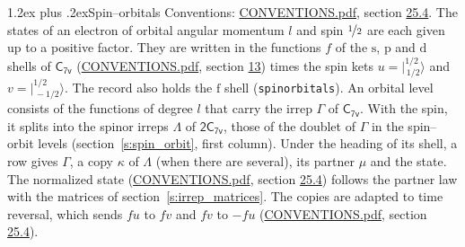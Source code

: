 \documentclass[10pt,a4paper]{article}
\makeatletter
\renewcommand\section{\@startsection{section}{1}{\z@}{-3ex plus -1ex minus -.2ex}%
  {1.2ex plus .2ex}{\normalfont\large\sffamily\bfseries\color{parttitle}}}
\numberwithin{equation}{section}
\newcommand{\grp}[1]{\mathsf{#1}}
\newcommand{\orbital}[1]{\mathrm{#1}}
\newcommand{\mult}{\kappa}
\newcommand{\intx}{\mu}
\newcommand{\jm}[2]{\bigl\lvert{}^{#1}_{\,#2}\bigr\rangle}
\makeatother
\begin{document}
\section{Spin--orbitals}\label{s:spin_orbitals}
Conventions: \href{../../CONVENTIONS.pdf}{CONVENTIONS.pdf}, section \href{../../CONVENTIONS.pdf\#conv.25.4}{25.4}.
\leavevmode\label{n:index.orbital.l}The states of an electron of orbital angular momentum $l$ and spin $\nicefrac{1}{2}$ are each given up to a positive factor. \label{n:local.spinor.uv}\label{n:local.function.f}They are written in the functions $f$ of the $\orbital{s}$, $\orbital{p}$ and $\orbital{d}$ shells of \href{../../../rotation/data/pdf/C7v.pdf}{$\grp{C_{7v}}$} (\href{../../CONVENTIONS.pdf}{CONVENTIONS.pdf}, section \href{../../../rotation/CONVENTIONS.pdf\#conv.13}{13}) times the spin kets $u = \jm{1/2}{1/2}$ and $v = \jm{1/2}{-1/2}$. The record also holds the $\orbital{f}$ shell (\texttt{spinorbitals}). An orbital level consists of the functions of degree $l$ that carry the irrep $\Gamma$ of \href{../../../rotation/data/pdf/C7v.pdf}{$\grp{C_{7v}}$}. With the spin, it splits into the spinor irreps $\Lambda$ of $\grp{2C_{7v}}$, those of the doublet of $\Gamma$ in the spin--orbit levels (section~\ref{s:spin_orbit}, first column). \label{n:head.state}Under the heading of its shell, a row gives $\Gamma$, a copy $\mult$ of $\Lambda$ (when there are several), its partner $\intx$ and the state. The normalized state (\href{../../CONVENTIONS.pdf}{CONVENTIONS.pdf}, section \href{../../CONVENTIONS.pdf\#conv.25.4}{25.4}) follows the partner law with the matrices of section~\ref{s:irrep_matrices}. The copies are adapted to time reversal, which sends $f u$ to $f v$ and $f v$ to $-f u$ (\href{../../CONVENTIONS.pdf}{CONVENTIONS.pdf}, section \href{../../CONVENTIONS.pdf\#conv.25.4}{25.4}).
\end{document}
